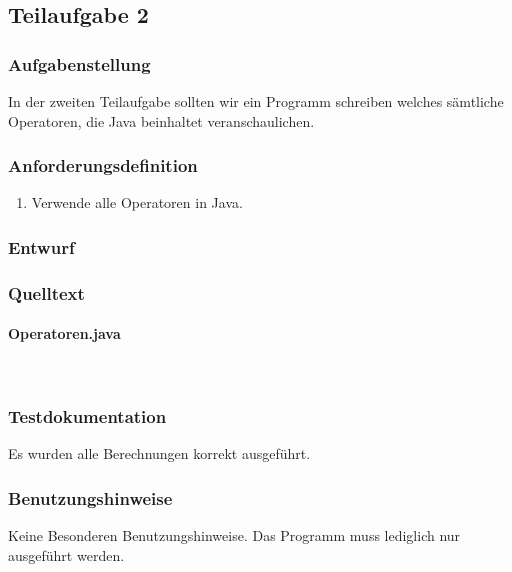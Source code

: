 \subsection{Teilaufgabe 2}
\subsubsection{Aufgabenstellung}
In der zweiten Teilaufgabe sollten wir ein Programm schreiben welches sämtliche Operatoren,
die Java beinhaltet veranschaulichen.

\subsubsection{Anforderungsdefinition}
\begin{enumerate}
	\item Verwende alle Operatoren in Java.
\end{enumerate}

\subsubsection{Entwurf}


\subsubsection{Quelltext}
\paragraph{Operatoren.java}\


\subsubsection{Testdokumentation}
Es wurden alle Berechnungen korrekt ausgeführt.

\subsubsection{Benutzungshinweise}
Keine Besonderen Benutzungshinweise.
Das Programm muss lediglich nur ausgeführt werden.

